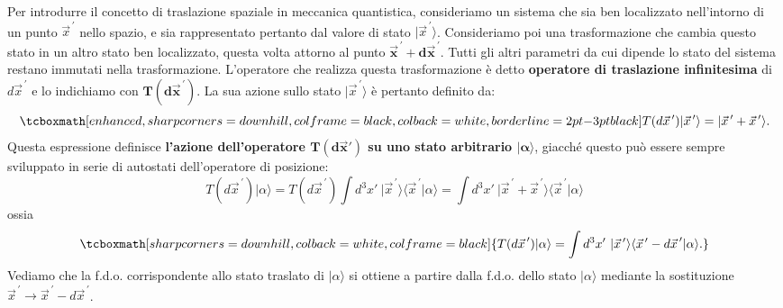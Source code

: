 \documentclass[a4paper,12pt,oneside]{book}
\begin{document}
Per introdurre il concetto di traslazione spaziale in meccanica quantistica, consideriamo un sistema che sia ben localizzato nell'intorno di un punto ${\vec{x}}^{\, \prime}$ nello spazio, e sia rappresentato pertanto dal valore di stato $\vert {\vec{x}}^{\, \prime} \rangle$. Consideriamo poi una trasformazione che cambia questo stato in un altro stato ben localizzato, questa volta attorno al punto $\mathbf{{\vec{x}}^{\, \prime} + d{\vec{x}}^{\, \prime}}$. Tutti gli altri parametri da cui dipende lo stato del sistema restano immutati nella trasformazione. L'operatore che realizza questa trasformazione è detto \textbf{operatore di traslazione infinitesima} di $d{\vec{x}}^{\, \prime}$ e lo indichiamo con $\mathbf{T(d{\vec{x}}^{\, \prime})}$. La sua azione sullo stato
 $\vert {\vec{x}}^{\, \prime} \rangle$ è pertanto definito da:
	\begin{equation}
		\tcboxmath[enhanced, sharp corners=downhill, colframe=black, colback=white, borderline={2pt}{-3pt}{black}]{
			T(d{\vec{x}}^{\, \prime})\vert {\vec{x}}^{\, \prime} \rangle=\vert {\vec{x}}^{\, \prime}+ {\vec{x}}^{\, \prime} \rangle .
			}
	\end{equation}
Questa espressione definisce \textbf{l'azione dell'operatore $\mathbf{T(d\vec{x}')}$ su uno stato arbitrario $\mathbf{\vert \alpha \rangle}$}, giacché questo può essere sempre sviluppato in serie di autostati dell'operatore di posizione:
	\begin{equation}
		T({d\vec{x}}^{\, \prime}) \vert \alpha \rangle = T(d{\vec{x}}^{\, \prime}) \int d^3x' \ \vert {\vec{x}}^{\, \prime} \rangle \langle {\vec{x}}^{\, \prime} \vert \alpha \rangle =   \int d^3x' \ {\vert \vec{x}}^{\, \prime} + {\vec{x}}^{\, \prime} \rangle \langle {\vec{x}}^{\, \prime} \vert \alpha \rangle 
	\end{equation}
ossia
	\begin{equation}
		\tcboxmath[sharp corners=downhill, colback=white, colframe=black]{
			T({d\vec{x}}^{\, \prime}) \vert \alpha \rangle  = \int d^3x' \ \vert {\vec{x}}^{\, \prime}  \rangle \langle {\vec{x}}^{\, \prime} - {d\vec{x}}^{\, \prime} \vert \alpha \rangle .
			}
	\end{equation}
Vediamo che la f.d.o. corrispondente allo stato traslato di $\vert \alpha \rangle $ si ottiene a partire dalla f.d.o. dello stato $\vert \alpha \rangle $ mediante la sostituzione ${\vec{x}}^{\, \prime} \rightarrow {\vec{x}}^{\, \prime}-d{\vec{x}}^{\, \prime}$.\\
\end{document}
